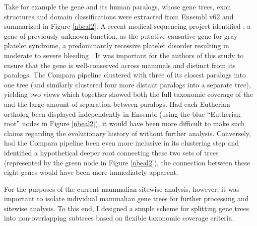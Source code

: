 Take for example the gene  and its human paralogs, whose gene
trees, exon structures and domain classifications were extracted from
Ensembl v62 and summarized in Figure \ref{nbeal2}. A recent medical
sequencing project identified , a gene of previously unknown
function, as the putative causative gene for gray platelet syndrome, a
predominantly recessive platelet disorder resulting in moderate to
severe bleeding \citep{TODO}. It was important for the
authors of this study to ensure that the  gene is well-conserved
across mammals and distinct from its paralogs. The Compara pipeline
clustered  with three of its closest paralogs into one tree (and
similarly clustered four more distant  paralogs into a separate
tree), yielding two views which together showed both the full
taxonomic coverage of the  \subtr{} and the large amount of
separation between paralogs. Had each Eutherian ortholog been
displayed independently in Ensembl (using the blue ``Eutherian root'' nodes in
Figure \ref{nbeal2}), it would have been more difficult to make such
claims regarding the evolutionary history of  without further
analysis. Conversely, had the Compara pipeline been even more
inclusive in its clustering step and identified a hypothetical deeper
root connecting these two sets of trees (represented by the green node
in Figure \ref{nbeal2}), the connection between these eight genes
would have been more immediately apparent.

For the purposes of the current mammalian sitewise analysis, however,
it was important to isolate individual mammalian gene trees for
further processing and sitewise analysis. To this end, I designed a
simple scheme for splitting gene trees into non-overlapping subtrees
based on flexible taxonomic coverage criteria.

